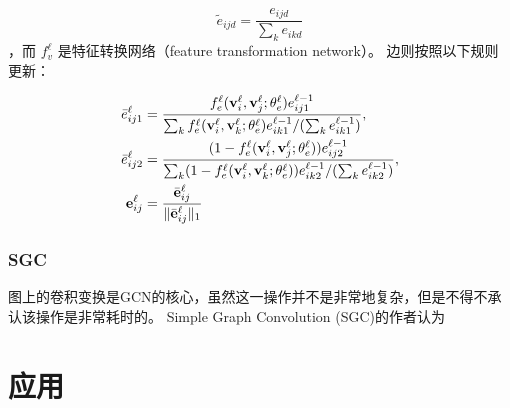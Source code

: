 \documentclass[color=gray,base=hide,cn]{elegantbook}
\begin{document}
\begin{equation}
    {\tilde e}_{ijd} = \frac{e_{ijd}}{\sum_{k}e_{ikd}}
\end{equation}
，而 $f_v^{\ell}$ 是特征转换网络（feature transformation network）。
边则按照以下规则更新：

\begin{align}
    {\bar e}_{ij1}^{\ell} & = \frac{f_{e}^{\ell}({\bf v}_{i}^{\ell}, {\bf v}_{j}^{\ell}; \theta_e^{\ell})e_{ij1}^{\ell-1}}{\sum_{k}f_{e}^{\ell}({\bf v}_{i}^{\ell}, {\bf v}_{k}^{\ell}; \theta_e^{\ell})e_{ik1}^{\ell-1}/(\sum_{k}e_{ik1}^{\ell-1})},        \\
    {\bar e}_{ij2}^{\ell} & =\frac{(1-f_{e}^{\ell}({\bf v}_{i}^{\ell}, {\bf v}_{j}^{\ell}; \theta_e^{\ell}))e_{ij2}^{\ell-1}}{\sum_{k}(1-f_{e}^{\ell}({\bf v}_{i}^{\ell}, {\bf v}_{k}^{\ell}; \theta_e^{\ell}))e_{ik2}^{\ell-1}/(\sum_{k}e_{ik2}^{\ell-1})},
    \\
    {\bf e}_{ij}^{\ell}   & = \frac{{\bar {\bf e}}_{ij}^{\ell}} {\|{\bar {\bf e}}_{ij}^{\ell}\|_1}
\end{align}


\section{SGC}
图上的卷积变换是GCN的核心，虽然这一操作并不是非常地复杂，但是不得不承认该操作是非常耗时的。 Simple Graph Convolution (SGC)\cite{wu2019simplifying}的作者认为

\part{应用}

% 

\end{document}
